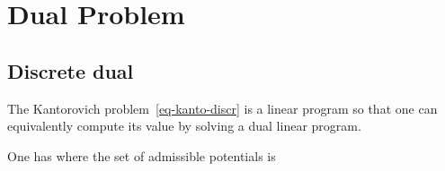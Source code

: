 
\section{Dual Problem}

\subsection{Discrete dual}


The Kantorovich problem~\eqref{eq-kanto-discr} is a linear program so that one can equivalently compute its value by solving a dual linear program. 


\begin{prop}\label{prop-duality-discr}
One has
\eql{\label{eq-dual}
	\MKD_\C(\a,\b) = 
	\umax{(\fD,\gD) \in \PotentialsD(\a,\b)} \dotp{\fD}{\a} + \dotp{\gD}{\b} 
}
where the set of admissible potentials is
\end{prop}

